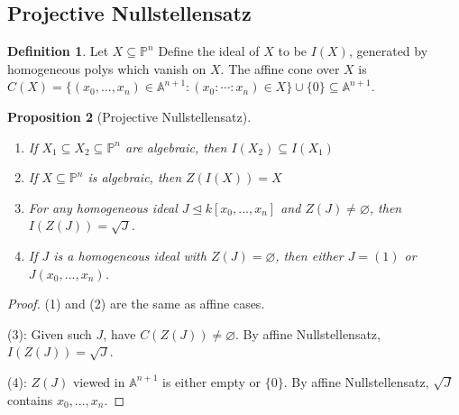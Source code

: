 \documentclass{article}
\theoremstyle{definition}
\newtheorem{defn}{Definition}[section]
\theoremstyle{remark}
\theoremstyle{plain}
\newtheorem{prop}[defn]{Proposition}
\newcommand{\PP}{\mathbb{P}}
\newcommand{\bA}{\mathbb{A}}
\begin{document}
\subsection{Projective Nullstellensatz}
\begin{defn}
    Let $X\subseteq\PP^n$ Define the ideal of $X$ to be $I(X)$, generated by homogeneous polys which vanish on $X$. The affine cone over $X$ is $C(X)=\{(x_0,...,x_n)\in\bA^{n+1}:(x_0:\cdots:x_n)\in X\}\cup\{0\}\subseteq\bA^{n+1}$.
\end{defn}
\begin{prop}[Projective Nullstellensatz]\
    \begin{enumerate}[(1)]
        \item If $X_1\subseteq X_2\subseteq\PP^n$ are algebraic, then $I(X_2)\subseteq I(X_1)$
        \item  If $X\subseteq\PP^n$ is algebraic, then $Z(I(X))=X$
        \item For any homogeneous ideal $J\trianglelefteq k[x_0,...,x_n]$ and $Z(J)\neq\varnothing$, then $I(Z(J))=\sqrt{J}$.
        \item If $J$ is a homogeneous ideal with $Z(J)=\varnothing$, then either $J=(1)$ or $J(x_0,...,x_n)$.
    \end{enumerate}
\end{prop}
\begin{proof}
    (1) and (2) are the same as affine cases. 

    (3): Given such $J$, have $C(Z(J))\neq\varnothing$. By affine Nullstellensatz,  $I(Z(J))=\sqrt{J}$.

    (4): $Z(J)$ viewed in $\bA^{n+1}$ is either empty or $\{0\}$. By affine Nullstellensatz, $\sqrt{J}$ contains $x_0,...,x_n$.
\end{proof}
\end{document}
